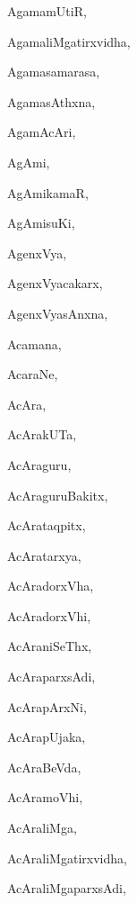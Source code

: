 \begin{multicols}{3}
{\noindent
{AgamamUtiR}, \pageref{AgamamUtiR}

\noindent
{AgamaliMgatirxvidha}, \pageref{AgamaliMgatirxvidha}

\noindent
{Agamasamarasa}, \pageref{Agamasamarasa}

\noindent
{AgamasAthxna}, \pageref{AgamasAthxna}

\noindent
{AgamAcAri}, \pageref{AgamAcAri}

\noindent
{AgAmi}, \pageref{AgAmi}

\noindent
{AgAmikamaR}, \pageref{AgAmikamaR}

\noindent
{AgAmisuKi}, \pageref{AgAmisuKi}

\noindent
{AgenxVya}, \pageref{AgenxVya}

\noindent
{AgenxVyacakarx}, \pageref{AgenxVyacakarx}

\noindent
{AgenxVyasAnxna}, \pageref{AgenxVyasAnxna}

\noindent
{Acamana}, \pageref{Acamana}

\noindent
{AcaraNe}, \pageref{AcaraNe}

\noindent
{AcAra}, \pageref{AcAra}

\noindent
{AcArakUTa}, \pageref{AcArakUTa}

\noindent
{AcAraguru}, \pageref{AcAraguru}

\noindent
{AcAraguruBakitx}, \pageref{AcAraguruBakitx}

\noindent
{AcArataqpitx}, \pageref{AcArataqpitx}

\noindent
{AcAratarxya}, \pageref{AcAratarxya}

\noindent
{AcAradorxVha}, \pageref{AcAradorxVha}

\noindent
{AcAradorxVhi}, \pageref{AcAradorxVhi}

\noindent
{AcAraniSeThx}, \pageref{AcAraniSeThx}

\noindent
{AcAraparxsAdi}, \pageref{AcAraparxsAdi}

\noindent
{AcArapArxNi}, \pageref{AcArapArxNi}

\noindent
{AcArapUjaka}, \pageref{AcArapUjaka}

\noindent
{AcAraBeVda}, \pageref{AcAraBeVda}

\noindent
{AcAramoVhi}, \pageref{AcAramoVhi}

\noindent
{AcAraliMga}, \pageref{AcAraliMga}

\noindent
{AcAraliMgatirxvidha}, \pageref{AcAraliMgatirxvidha}

\noindent
{AcAraliMgaparxsAdi}, \pageref{AcAraliMgaparxsAdi}

}
\end{multicols}

